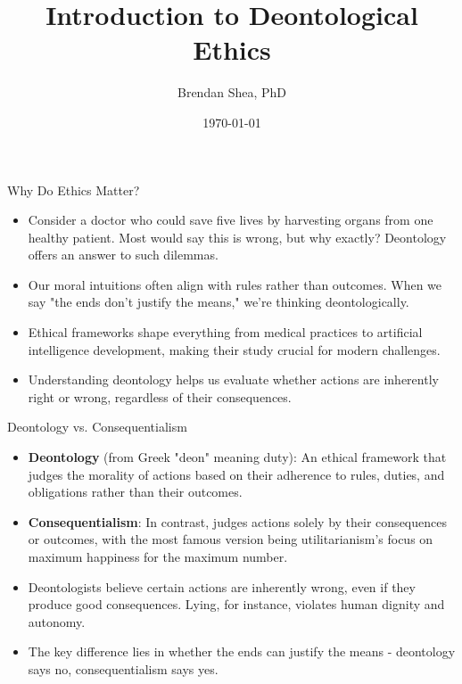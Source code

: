\documentclass{beamer}
\title{Introduction to Deontological Ethics}
\author{Brendan Shea, PhD}
\date{\today}
\begin{document}
\begin{frame}
\titlepage
\end{frame}

\begin{frame}{Why Do Ethics Matter?}
\begin{itemize}
    \item Consider a doctor who could save five lives by harvesting organs from one healthy patient. Most would say this is wrong, but why exactly? Deontology offers an answer to such dilemmas.
    
    \item Our moral intuitions often align with rules rather than outcomes. When we say "the ends don't justify the means," we're thinking deontologically.
    
    \item Ethical frameworks shape everything from medical practices to artificial intelligence development, making their study crucial for modern challenges.
    
    \item Understanding deontology helps us evaluate whether actions are inherently right or wrong, regardless of their consequences.
\end{itemize}
\end{frame}

\begin{frame}{Deontology vs. Consequentialism}
\begin{itemize}
    \item \textbf{Deontology} (from Greek "deon" meaning duty): An ethical framework that judges the morality of actions based on their adherence to rules, duties, and obligations rather than their outcomes.
    
    \item \textbf{Consequentialism}: In contrast, judges actions solely by their consequences or outcomes, with the most famous version being utilitarianism's focus on maximum happiness for the maximum number.
    
    \item Deontologists believe certain actions are inherently wrong, even if they produce good consequences. Lying, for instance, violates human dignity and autonomy.
    
    \item The key difference lies in whether the ends can justify the means - deontology says no, consequentialism says yes.
\end{itemize}
\end{frame}
\end{document}
